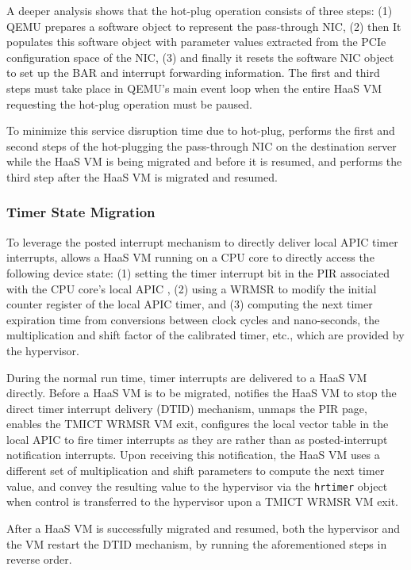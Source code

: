 A deeper analysis shows that the hot-plug operation consists of three steps:
(1) QEMU prepares a software object to represent the pass-through
NIC, (2) then It populates this software object with parameter values extracted
from the PCIe configuration space of the NIC, (3) and finally it
resets the software NIC object to set up the BAR and interrupt forwarding
information. The first and third steps must take place in QEMU's main event
loop when the entire HaaS VM requesting the hot-plug operation must be paused.

To minimize this service disruption time due to hot-plug,
\na performs the first and second steps of the hot-plugging the pass-through NIC
on the destination server while the HaaS VM is being migrated and before it is resumed,
and performs the third step after the HaaS VM is migrated and resumed.


\subsubsection{Timer State Migration}

To leverage the posted interrupt mechanism to directly deliver local APIC timer interrupts,
\na allows a HaaS VM running on a CPU core to directly access the following device state:
(1) setting the timer interrupt bit in the PIR associated with the CPU core's local APIC ,  (2)
using a WRMSR to modify the initial counter register of the local APIC timer, and (3)
computing the next timer expiration time from conversions between clock cycles and nano-seconds, the multiplication
and shift factor of the calibrated timer, etc., which are provided by the hypervisor.

During the normal run time, timer interrupts are delivered to a HaaS VM directly.
Before a HaaS VM is to be migrated, \na notifies the HaaS VM to stop the
direct timer interrupt delivery (DTID) mechanism, unmaps the PIR page,
enables the TMICT WRMSR VM exit, configures the local vector table in the local APIC to
fire timer interrupts as they are rather than as posted-interrupt notification interrupts.
Upon receiving this notification, the HaaS VM uses a different set of
multiplication and shift parameters to compute the next timer value,
and convey the resulting value to the hypervisor via the \texttt{hrtimer} object
when control is transferred to the hypervisor upon a TMICT WRMSR VM exit.

After a HaaS VM is successfully migrated and resumed, both the hypervisor and the VM restart
the DTID mechanism, by running
the aforementioned steps in reverse order.



